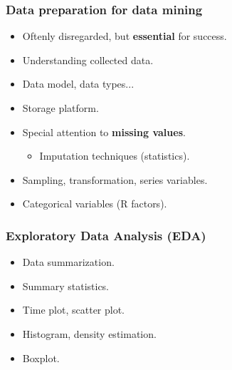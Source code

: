 
\begin{frame}
\frametitle{Data preparation for data mining}

\begin{itemize}
 \item Oftenly disregarded, but \textbf{essential} for success.
 \item Understanding collected data.
 \item Data model, data types...
 \item Storage platform.
 \item Special attention to \textbf{missing values}.
 \begin{itemize}
  \item Imputation techniques (statistics).
 \end{itemize}
 \item Sampling, transformation, series variables.
 \item Categorical variables (R factors).
\end{itemize}


\end{frame}


\begin{frame}
\frametitle{Exploratory Data Analysis (EDA)}

\begin{itemize}
 \item Data summarization.
 \item Summary statistics.
 \item Time plot, scatter plot.
 \item Histogram, density estimation.
 \item Boxplot.

\end{itemize}

\end{frame}


